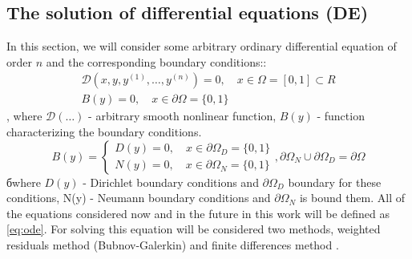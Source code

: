 \subsection{The solution of differential equations (DE)}
In this section, we will consider some arbitrary ordinary differential equation of order $n$ and the corresponding boundary conditions::
\begin{equation}
	\label{eq:ode}
	\begin{multlined}
		\mathcal{D}\left (x, y, y^{(1)}, \dots, y^{(n)}\right) = 0, \quad x \in \Omega = [0, 1] \subset  R \\
		B(y) = 0, \quad x \in \partial \Omega = \{0, 1\}
	\end{multlined}
\end{equation}
, where $\mathcal{D}(\dots)$ - arbitrary smooth nonlinear function, $B(y)$ - function characterizing the boundary conditions. 
\begin{equation*}
	B(y) = \begin{cases}
		D(y) = 0, \quad x \in \partial \Omega_D = \{0, 1\} \\
		N(y) = 0, \quad x \in \partial \Omega_N = \{0, 1\} 
	\end{cases}, \partial \Omega_N \cup \partial \Omega_D = \partial \Omega
\end{equation*}
бwhere $D(y)$ - Dirichlet boundary conditions and $\partial \Omega_D$ boundary for these conditions, N(y) - Neumann boundary conditions and $\partial \Omega_N$ is bound them.
All of the equations considered now and in the future in this work will be defined as \eqref{eq:ode}.
For solving this equation will be considered two methods, weighted residuals method \cite{fletcher2012computational} (Bubnov-Galerkin) and finite differences method \cite{dimov2019finite}.


